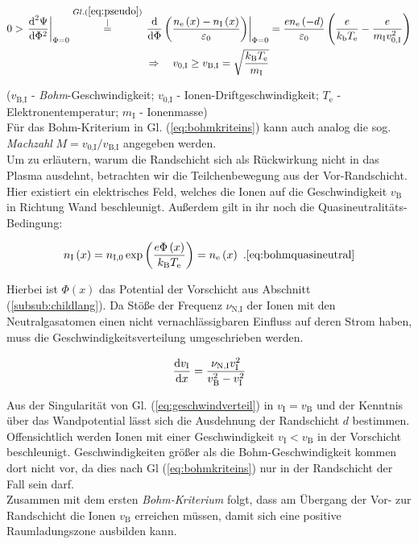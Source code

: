 \documentclass[numbers=noenddot,a4paper]{scrartcl}
\newcommand{\diff}{\textnormal{d}}
\newcommand{\ix}[1]{_\text{#1}}
\newcommand{\tilt}[1]{\textit{#1}}
\begin{document}
				\begin{align}
					0>\left.\frac{\diff^{2}\Psi}{\diff\Phi^{2}}\right|_{\Phi=0}\overset{Gl. (\ref{eq:pseudo})}{\overset{\mid}{=}}\left.\frac{\diff}{\diff\Phi}\left(\frac{n\ix{e}\left(x\right)-n\ix{I}\left(x\right)}{\varepsilon\ix{0}}\right)\right|_{\Phi=0}&=\frac{en\ix{e}\left(-d\right)}{\varepsilon\ix{0}}\left(\frac{e}{k\ix{b}T\ix{e}}-\frac{e}{m\ix{I}v\ix{0,I}^{2}}\right) \label{eq:beding} \\
					\Rightarrow \quad v\ix{0,I}\ge v\ix{B,I}=\sqrt{\frac{k\ix{B}T\ix{e}}{m\ix{I}}}& \label{eq:bohmkriteins}
				\end{align}

			($v\ix{B,I}$ - \tilt{Bohm}-Geschwindigkeit; $v\ix{0,I}$ - Ionen-Driftgeschwindigkeit; $T\ix{e}$ - Elektronentemperatur; $m\ix{I}$ - Ionenmasse)\\
			Für das Bohm-Kriterium in Gl. (\ref{eq:bohmkriteins}) kann auch analog die sog. \tilt{Machzahl} $M=v\ix{0,I}/v\ix{B,I}$ angegeben werden.\\
			Um zu erläutern, warum die Randschicht sich als Rückwirkung nicht in das Plasma ausdehnt, betrachten wir die Teilchenbewegung aus der Vor-Randschicht. Hier existiert ein elektrisches Feld, welches die Ionen auf die Geschwindigkeit $v\ix{B}$ in Richtung Wand beschleunigt. Außerdem gilt in ihr noch die Quasineutralitäts-Bedingung:

				\begin{align}
					n\ix{I}\left(x\right)=n\ix{I,0}\exp\left(\frac{e\Phi\left(x\right)}{k\ix{B}T\ix{e}}\right)=n\ix{e}\left(x\right)\,\, . \ref{eq:bohmquasineutral}
				\end{align}

			Hierbei ist $\Phi\left(x\right)$ das Potential der Vorschicht aus Abschnitt  (\ref{subsub:childlang}). 
			Da Stöße der Frequenz $\nu\ix{N,I}$ der Ionen mit den Neutralgasatomen einen nicht vernachlässigbaren Einfluss auf deren Strom haben, muss die Geschwindigkeitsverteilung umgeschrieben werden.

				\begin{align}
					\frac{\diff v\ix{I}}{\diff x}=\frac{\nu\ix{N,I}v\ix{I}^2}{v\ix{B}^2-v\ix{I}^2} \label{eq:geschwindverteil}
				\end{align}

			Aus der Singularität von Gl. (\ref{eq:geschwindverteil}) in $v\ix{I}=v\ix{B}$ und der Kenntnis über das Wandpotential lässt sich die Ausdehnung der Randschicht $d$ bestimmen. Offensichtlich werden Ionen mit einer Geschwindigkeit $v\ix{I}<v\ix{B}$ in der Vorschicht beschleunigt. Geschwindigkeiten größer als die Bohm-Geschwindigkeit kommen dort nicht vor, da dies nach Gl (\ref{eq:bohmkriteins}) nur in der Randschicht der Fall sein darf. \\
			Zusammen mit dem ersten \tilt{Bohm-Kriterium} folgt, dass am Übergang der Vor- zur Randschicht die Ionen $v\ix{B}$ erreichen müssen, damit sich eine positive Raumladungszone ausbilden kann.
\end{document}
